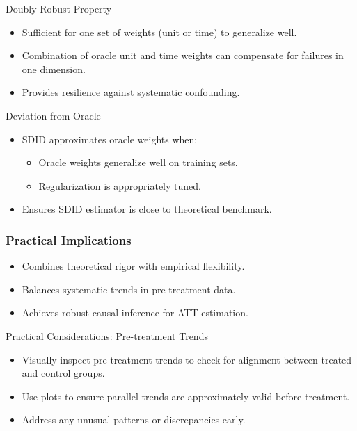 \documentclass{beamer}
\begin{document}
\begin{frame}{Doubly Robust Property}
\begin{itemize}
\item Sufficient for one set of weights (unit or time) to generalize well.
\item Combination of oracle unit and time weights can compensate for failures in one dimension.
\item Provides resilience against systematic confounding.
\end{itemize}
\end{frame}

\begin{frame}{Deviation from Oracle}
\begin{itemize}
\item SDID approximates oracle weights when:
    \begin{itemize}
    \item Oracle weights generalize well on training sets.
    \item Regularization is appropriately tuned.
    \end{itemize}
\item Ensures SDID estimator is close to theoretical benchmark.
\end{itemize}
\end{frame}


\begin{frame}
\frametitle{Practical Implications}

\begin{itemize}
    \item Combines theoretical rigor with empirical flexibility.
    \item Balances systematic trends in pre-treatment data.
    \item Achieves robust causal inference for ATT estimation.
\end{itemize}

\end{frame}



\begin{frame}{Practical Considerations: Pre-treatment Trends}

\begin{itemize}
    \item Visually inspect pre-treatment trends to check for alignment between treated and control groups.
    \item Use plots to ensure parallel trends are approximately valid before treatment.
    \item Address any unusual patterns or discrepancies early.
\end{itemize}

\end{frame}
\end{document}
